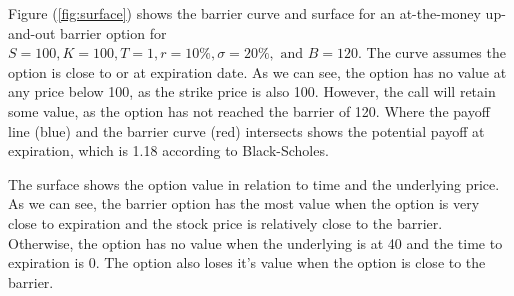 Figure (\ref{fig:surface}) shows the barrier curve and surface for an at-the-money up-and-out barrier option for $S=100,K=100, T=1, r=10\%,\sigma=20\%, \text{ and }B=120$. The curve assumes the option is close to or at expiration date. As we can see, the option has no value at any price below 100, as the strike price is also 100. However, the call will retain some value, as the option has not reached the barrier of 120. Where the payoff line (blue) and the barrier curve (red) intersects shows the potential payoff at expiration, which is 1.18 according to Black-Scholes.

The surface shows the option value in relation to time and the underlying price. As we can see, the barrier option has the most value when the option is very close to expiration and the stock price is relatively close to the barrier. Otherwise, the option has no value when the underlying is at 40 and the time to expiration is 0. The option also loses it's value when the option is close to the barrier.
